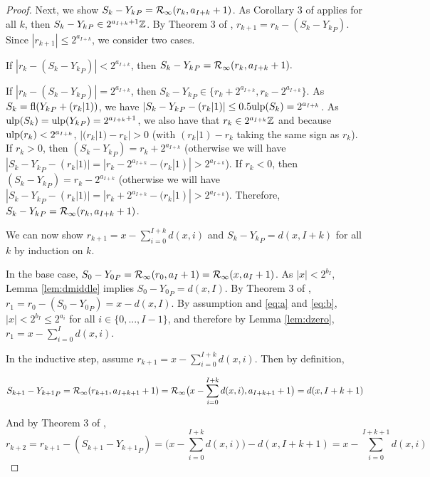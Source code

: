 \begin{proof}
        Next, we show $S_k - {Y_k}_P = \mathcal{R}_\text{$\infty$}(r_k, a_{I + k} + 1)$.
        As Corollary 3 of \cite{repsum} applies for all $k$, then
        $S_k - {Y_k}_P \in 2^{a_{I + k} + 1}\mathbb{Z}$.
        By Theorem 3 of \cite{repsum}, $r_{k + 1} = r_k - (S_k - {Y_k}_P)$.
        Since $|r_{k + 1}| \leq 2^{a_{I + k}}$, we consider two cases.

        If $|r_k - (S_k - {Y_k}_P)| < 2^{a_{I + k}}$, then
        \(
            S_k - {Y_k}_P = \mathcal{R}_\text{$\infty$}(r_k, a_{I + k} + 1).
        \)

        If $|r_k - (S_k - {Y_k}_P)| = 2^{a_{I + k}}$, then $S_k - {Y_k}_P \in \{r_k + 2^{a_{I + k}},  r_k - 2^{a_{I + k}}\}$.
        As $S_k = \text{fl}({Y_k}_P + (r_k|1))$, we have $|S_k - {Y_k}_P - (r_k|1)| \leq 0.5\text{ulp}(S_k) = 2^{a_{I + k}}$.  As $\text{ulp}(S_k) = \text{ulp}({Y_k}_P) = 2^{a_{I + k} + 1}$, we also have that $r_k \in 2^{a_{I + k}}\mathbb{Z}$  and because $\text{ulp}(r_k) < 2^{a_{I + k}}$, $|(r_k|1) - r_k| > 0$ (with $(r_k|1) - r_k$ taking the same sign as $r_k$).
        If $r_k > 0$, then $(S_k - {Y_k}_P) = r_k + 2^{a_{I + k}}$ (otherwise we will have $|S_k - {Y_k}_P - (r_k|1)| = |r_k - 2^{a_{I + k}} - (r_k|1)| > 2^{a_{I + k}}$).
        If $r_k < 0$, then $(S_k - {Y_k}_P) = r_k - 2^{a_{I + k}}$ (otherwise we will have $|S_k - {Y_k}_P - (r_k|1)| = |r_k + 2^{a_{I + k}} - (r_k|1)| > 2^{a_{I + k}}$). Therefore, $S_k - {Y_k}_P = \mathcal{R}_\text{$\infty$}(r_k, a_{I + k} + 1)$.

        We can now show $r_{k + 1} = x - \sum\limits_{i = 0}^{I + k}d(x, i)$ and $S_k - {Y_k}_P = d(x, I + k)$ for all $k$ by induction on $k$.

        In the base case, $S_0 - {Y_0}_P = \mathcal{R}_\text{$\infty$}(r_0, a_I + 1) = \mathcal{R}_\text{$\infty$}(x, a_I + 1)$. As $|x| < 2^{b_I}$, Lemma \ref{lem:dmiddle} implies $S_0 - {Y_0}_P = d(x, I)$. By Theorem 3 of \cite{repsum}, $r_1 = r_0 - (S_0 - {Y_0}_P) = x - d(x,I)$. By assumption and  \eqref{eq:a} and \eqref{eq:b}, $|x| < 2^{b_I} \leq 2^{a_{i}}$ for all $i \in \{0, ..., I - 1\}$, and therefore by Lemma \ref{lem:dzero}, $r_1 = x - \sum\limits_{i = 0}^Id(x, i)$.

        In the inductive step, assume $r_{k + 1} = x - \sum\limits_{i = 0}^{I + k}d(x, i)$. Then by definition,

        \begin{equation*}
          S_{k + 1} - {Y_{k + 1}}_P = \mathcal{R}_\text{$\infty$}(r_{k + 1}, a_{I + k + 1} + 1) = \mathcal{R}_\text{$\infty$}\bigl(x - \sum\limits_{i = 0}^{I + k}d(x, i), a_{I + k + 1} + 1\bigr) = d(x, I + k + 1)
        \end{equation*}

        And by Theorem 3 of \cite{repsum},
        \begin{equation*}
          r_{k + 2} = r_{k + 1} - (S_{k + 1} - {Y_{k + 1}}_P) = \bigl(x - \sum\limits_{i = 0}^{I + k}d(x, i)\bigr) - d(x, I + k + 1) = x - \sum\limits_{i = 0}^{I + k + 1}d(x, i)
        \end{equation*}
      \end{proof}

